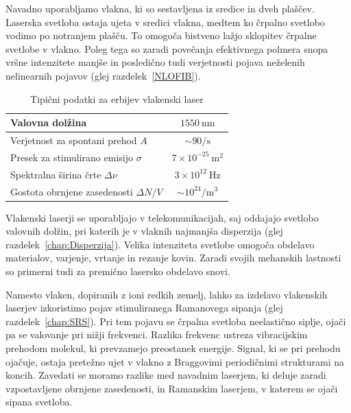 Navadno uporabljamo vlakna, ki so sestavljena iz sredice in dveh plaščev. Laserska
svetloba ostaja ujeta v sredici vlakna, medtem ko črpalno svetlobo vodimo po notranjem plašču. To
omogoča bistveno lažjo sklopitev črpalne svetlobe v vlakno. Poleg tega so zaradi povečanja
efektivnega polmera snopa vršne intenzitete manjše in posledično tudi verjetnosti
pojava neželenih nelinearnih pojavov (glej razdelek~\ref{NLOFIB}).
\begin{table}[!ht]
\begin{center}
\begin{tabular}{|l|c|}\hline
Valovna dolžina  & $1550~\si{\nano\meter}$\\ \hline
Verjetnost za spontani prehod $A$ & $ \sim 90/\si{\second}$ \\ \hline
Presek za stimulirano emisijo $\sigma$ & $7 \times 10^{-25}~\si{\metre}^2$ \\ \hline
Spektralna širina črte $\Delta \nu$ & $3 \times 10^{12}~\si{\hertz}$  \\ \hline
Gostota obrnjene zasedenosti $\Delta N/V$ & $ \sim 10^{24}/\si{\metre}^3$ \\ \hline
\end{tabular}
\caption{Tipični podatki za erbijev vlakenski laser}
\label{tab:fib}
\end{center}
\end{table}

Vlakenski laserji se uporabljajo v telekomunikacijah, saj oddajajo svetlobo 
valovnih dolžin, pri katerih je v vlaknih najmanjša disperzija (glej razdelek~\ref{chap:Disperzija}). 
Velika intenziteta svetlobe omogoča obdelavo materialov, varjenje, vrtanje in rezanje kovin. 
Zaradi svojih mehanskih lastnosti so primerni tudi za premično lasersko obdelavo snovi.



\begin{remark}
 Namesto vlaken, dopiranih z ioni redkih zemelj, lahko za izdelavo vlakenskih laserjev
 izkoristimo pojav stimuliranega Ramanovega sipanja (glej razdelek~\ref{chap:SRS}). 
 Pri tem pojavu se črpalna svetloba neelastično siplje, ojači pa se valovanje 
 pri nižji frekvenci. Razlika frekvenc ustreza vibracijskim prehodom 
 molekul, ki prevzamejo preostanek energije. Signal, ki se pri prehodu ojačuje, 
 ostaja pretežno ujet v vlakno z Braggovimi periodičnimi strukturami na koncih.
 Zavedati se moramo razlike med navadnim laserjem, ki deluje zaradi vzpostavljene
 obrnjene zasedenosti, in Ramanskim laserjem, v katerem se ojači sipana
 svetloba.
\end{remark}

